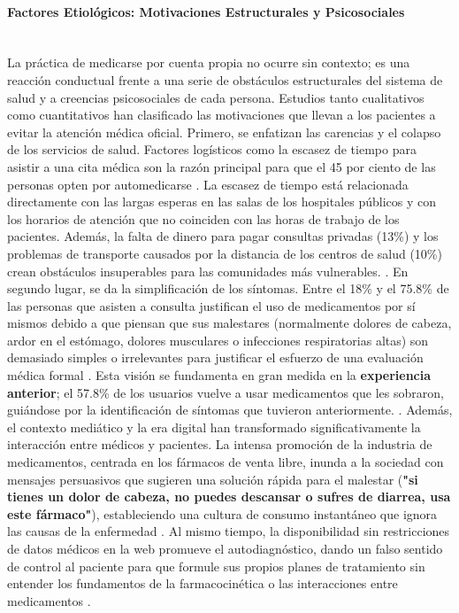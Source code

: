  \paragraph{Factores Etiológicos: Motivaciones Estructurales y Psicosociales}\leavevmode \\
 
La práctica de medicarse por cuenta propia no ocurre sin contexto; es una reacción conductual frente a una serie de obstáculos estructurales del sistema de salud y a creencias psicosociales de cada persona. Estudios tanto cualitativos como cuantitativos han clasificado las motivaciones que llevan a los pacientes a evitar la atención médica oficial.
Primero, se enfatizan las carencias y el colapso de los servicios de salud. Factores logísticos como la escasez de tiempo para asistir a una cita médica son la razón principal para que el 45 por ciento de las personas opten por automedicarse \cite{automedicacion_pandemia_2024}. La escasez de tiempo está relacionada directamente con las largas esperas en las salas de los hospitales públicos y con los horarios de atención que no coinciden con las horas de trabajo de los pacientes. Además, la falta de dinero para pagar consultas privadas (13\%) y los problemas de transporte causados por la distancia de los centros de salud (10\%) crean obstáculos insuperables para las comunidades más vulnerables. \cite{ramos2025automedicacion}.
En segundo lugar, se da la simplificación de los síntomas. Entre el 18\% y el 75.8\% de las personas que asisten a consulta justifican el uso de medicamentos por sí mismos debido a que piensan que sus malestares (normalmente dolores de cabeza, ardor en el estómago, dolores musculares o infecciones respiratorias altas) son demasiado simples o irrelevantes para justificar el esfuerzo de una evaluación médica formal \cite{automedicacion_pandemia_2024}. Esta visión se fundamenta en gran medida en la \textbf{experiencia anterior}; el 57.8\% de los usuarios vuelve a usar medicamentos que les sobraron, guiándose por la identificación de síntomas que tuvieron anteriormente. \cite{ramos2025automedicacion}.
Además, el contexto mediático y la era digital han transformado significativamente la interacción entre médicos y pacientes. La intensa promoción de la industria de medicamentos, centrada en los fármacos de venta libre, inunda a la sociedad con mensajes persuasivos que sugieren una solución rápida para el malestar (\textbf{"si tienes un dolor de cabeza, no puedes descansar o sufres de diarrea, usa este fármaco"}), estableciendo una cultura de consumo instantáneo que ignora las causas de la enfermedad \cite{pacha2023automedicacion}. Al mismo tiempo, la disponibilidad sin restricciones de datos médicos en la web promueve el autodiagnóstico, dando un falso sentido de control al paciente para que formule sus propios planes de tratamiento sin entender los fundamentos de la farmacocinética o las interacciones entre medicamentos \cite{automedicacion_pandemia_2024}.

